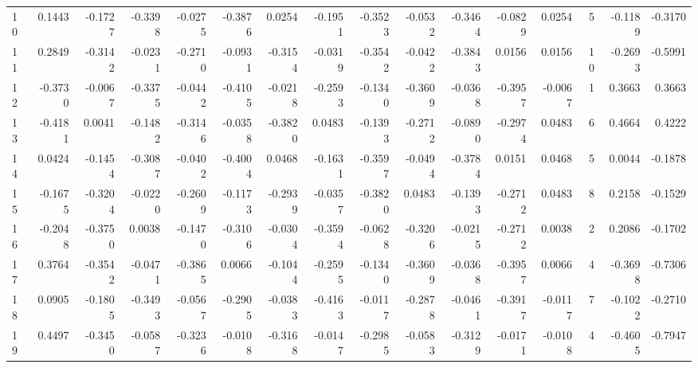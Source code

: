 \begin{tabular}{lrrrrrrrrrrrrrrr}
10 &      0.1443 & -0.1727 & -0.3398 & -0.0275 & -0.3876 &  0.0254 & -0.1951 & -0.3523 & -0.0532 & -0.3464 &  -0.0829 &     0.0254 &      5 &                   -0.1189 &                    -0.3170 \\
11 &      0.2849 & -0.3142 & -0.0231 & -0.2710 & -0.0931 & -0.3154 & -0.0319 & -0.3542 & -0.0422 & -0.3843 &   0.0156 &     0.0156 &     10 &                   -0.2693 &                    -0.5991 \\
12 &     -0.3730 & -0.0067 & -0.3375 & -0.0442 & -0.4105 & -0.0218 & -0.2593 & -0.1340 & -0.3609 & -0.0368 &  -0.3957 &    -0.0067 &      1 &                    0.3663 &                     0.3663 \\
13 &     -0.4181 &  0.0041 & -0.1482 & -0.3146 & -0.0358 & -0.3820 &  0.0483 & -0.1393 & -0.2712 & -0.0890 &  -0.2974 &     0.0483 &      6 &                    0.4664 &                     0.4222 \\
14 &      0.0424 & -0.1454 & -0.3087 & -0.0402 & -0.4004 &  0.0468 & -0.1631 & -0.3597 & -0.0494 & -0.3784 &   0.0151 &     0.0468 &      5 &                    0.0044 &                    -0.1878 \\
15 &     -0.1675 & -0.3204 & -0.0220 & -0.2609 & -0.1173 & -0.2939 & -0.0357 & -0.3820 &  0.0483 & -0.1393 &  -0.2712 &     0.0483 &      8 &                    0.2158 &                    -0.1529 \\
16 &     -0.2048 & -0.3750 &  0.0038 & -0.1470 & -0.3106 & -0.0304 & -0.3594 & -0.0628 & -0.3206 & -0.0215 &  -0.2712 &     0.0038 &      2 &                    0.2086 &                    -0.1702 \\
17 &      0.3764 & -0.3542 & -0.0471 & -0.3865 &  0.0066 & -0.1044 & -0.2595 & -0.1340 & -0.3609 & -0.0368 &  -0.3957 &     0.0066 &      4 &                   -0.3698 &                    -0.7306 \\
18 &      0.0905 & -0.1805 & -0.3493 & -0.0567 & -0.2905 & -0.0383 & -0.4163 & -0.0117 & -0.2878 & -0.0461 &  -0.3917 &    -0.0117 &      7 &                   -0.1022 &                    -0.2710 \\
19 &      0.4497 & -0.3450 & -0.0587 & -0.3236 & -0.0108 & -0.3168 & -0.0147 & -0.2985 & -0.0583 & -0.3129 &  -0.0171 &    -0.0108 &      4 &                   -0.4605 &                    -0.7947 \\
\bottomrule
\end{tabular}
